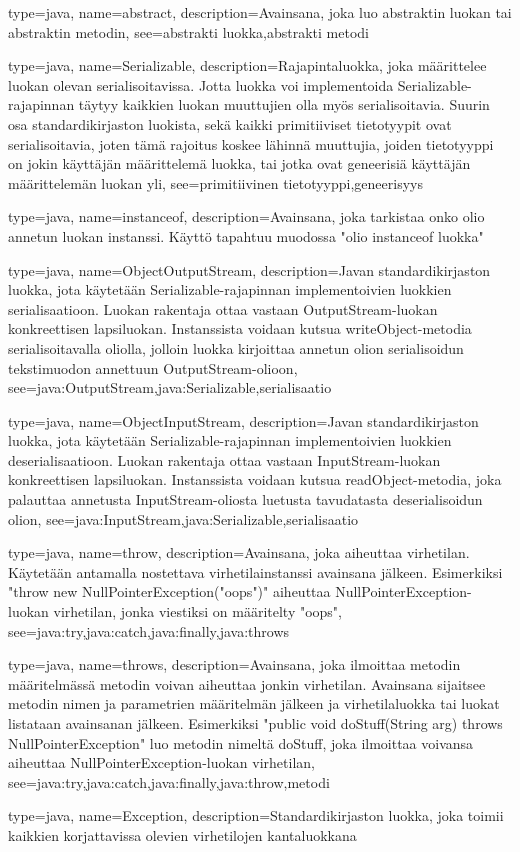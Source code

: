 {
	type=java,
	name=abstract,
	description={Avainsana, joka luo abstraktin luokan tai abstraktin metodin},
	see={abstrakti luokka,abstrakti metodi}
}

{
	type=java,
	name=Serializable,
	description={Rajapintaluokka, joka määrittelee luokan olevan serialisoitavissa. Jotta luokka
voi implementoida Serializable-rajapinnan täytyy kaikkien luokan muuttujien olla myös
serialisoitavia. Suurin osa standardikirjaston luokista, sekä kaikki primitiiviset tietotyypit
ovat serialisoitavia, joten tämä rajoitus koskee lähinnä muuttujia, joiden tietotyyppi on jokin
käyttäjän määrittelemä luokka, tai jotka ovat geneerisiä käyttäjän määrittelemän luokan yli},
	see={primitiivinen tietotyyppi,geneerisyys}
}

{
	type=java,
	name=instanceof,
	description={Avainsana, joka tarkistaa onko olio annetun luokan instanssi. Käyttö tapahtuu
muodossa "olio instanceof luokka"}
}

{
	type=java,
	name=ObjectOutputStream,
	description={Javan standardikirjaston luokka, jota käytetään Serializable-rajapinnan
implementoivien luokkien serialisaatioon. Luokan rakentaja ottaa vastaan OutputStream-luokan
konkreettisen lapsiluokan. Instanssista voidaan kutsua writeObject-metodia serialisoitavalla
oliolla, jolloin luokka kirjoittaa annetun olion serialisoidun tekstimuodon annettuun
OutputStream-olioon},
	see={java:OutputStream,java:Serializable,serialisaatio}
}

{
	type=java,
	name=ObjectInputStream,
	description={Javan standardikirjaston luokka, jota käytetään Serializable-rajapinnan
implementoivien luokkien deserialisaatioon. Luokan rakentaja ottaa vastaan InputStream-luokan
konkreettisen lapsiluokan. Instanssista voidaan kutsua readObject-metodia, joka palauttaa
annetusta InputStream-oliosta luetusta tavudatasta deserialisoidun olion},
	see={java:InputStream,java:Serializable,serialisaatio}
}

{
	type=java,
	name=throw,
	description={Avainsana, joka aiheuttaa virhetilan. Käytetään antamalla nostettava
virhetilainstanssi avainsana jälkeen. Esimerkiksi "throw new NullPointerException("oops")"
aiheuttaa NullPointerException-luokan virhetilan, jonka viestiksi on määritelty "oops"},
	see={java:try,java:catch,java:finally,java:throws}
}

{
	type=java,
	name=throws,
	description={Avainsana, joka ilmoittaa metodin määritelmässä metodin voivan aiheuttaa jonkin
virhetilan. Avainsana sijaitsee metodin nimen ja parametrien määritelmän jälkeen ja
virhetilaluokka tai luokat listataan avainsanan jälkeen. Esimerkiksi "public void doStuff(String
arg) throws NullPointerException" luo metodin nimeltä doStuff, joka ilmoittaa voivansa aiheuttaa
NullPointerException-luokan virhetilan},
	see={java:try,java:catch,java:finally,java:throw,metodi}
}

{
	type=java,
	name=Exception,
	description={Standardikirjaston luokka, joka toimii kaikkien korjattavissa olevien
virhetilojen kantaluokkana}
}